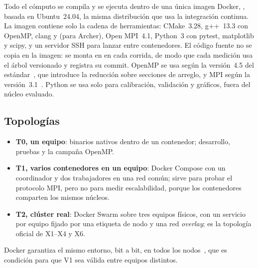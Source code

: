 Todo el cómputo se compila y se ejecuta dentro de una única imagen Docker, , basada en Ubuntu~24.04, la misma distribución que usa la integración continua. La imagen contiene solo la cadena de herramientas: CMake~3.28, g++~13.3 con OpenMP, clang y  (para Archer), Open MPI~4.1, Python~3 con pytest, matplotlib y scipy, y un servidor SSH para lanzar  entre contenedores. El código fuente no se copia en la imagen: se monta en  en cada corrida, de modo que cada medición usa el árbol versionado y registra su commit. OpenMP se usa según la versión~4.5 del estándar~\cite{openmp45}, que introduce la reducción sobre secciones de arreglo, y MPI según la versión~3.1~\cite{mpi31}. Python se usa solo para calibración, validación y gráficos, fuera del núcleo evaluado.

\subsection{Topologías}

\begin{itemize}
  \item \textbf{T0, un equipo}: binarios nativos dentro de un contenedor; desarrollo, pruebas y la campaña OpenMP.
  \item \textbf{T1, varios contenedores en un equipo}: Docker Compose con un coordinador y dos trabajadores en una red común; sirve para probar el protocolo MPI, pero no para medir escalabilidad, porque los contenedores comparten los mismos núcleos.
  \item \textbf{T2, clúster real}: Docker Swarm sobre tres equipos físicos, con un servicio por equipo fijado por una etiqueta de nodo y una red \emph{overlay}; es la topología oficial de X1--X4 y X6.
\end{itemize}
Docker garantiza el mismo entorno, bit a bit, en todos los nodos~\cite{merkel2014}, que es condición para que V1 sea válida entre equipos distintos.
